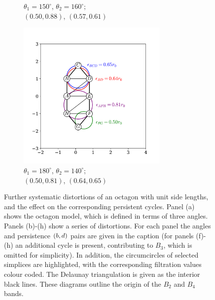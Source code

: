 \begin{figure}[tbp]
\begin{subfigure}[b]{0.32\textwidth}
         \caption{$\theta_1=150^\circ$, $\theta_2=160^\circ$; \\$\left(0.50,0.88\right)$, $\left(0.57,0.61\right)$}
         \label{fig:b4g}
     \end{subfigure}
      \hfill
     \begin{subfigure}[b]{0.32\textwidth}
         \centering
         \includegraphics[width=0.8\textwidth]{./figures/ph/sl_oct_b2_c.pdf}
         \caption{$\theta_1=180^\circ$, $\theta_2=140^\circ$; \\$\left(0.50,0.81\right)$, $\left(0.64,0.65\right)$}
         \label{fig:b4h}
     \end{subfigure}

	\caption{Further systematic distortions of an octagon with unit side lengths, and the effect on the corresponding persistent cycles. Panel (a) shows the octagon model, which is defined in terms of three angles. Panels (b)\--(h) show a series of distortions. For each panel the angles and persistence $\left(b,d\right)$ pairs are given in the caption (for panels (f)\--(h) an additional cycle is present, contributing to $B_3$, which is omitted for simplicity). In addition, the circumcircles of selected simplices are highlighted, with the corresponding filtration values colour coded. The Delaunay triangulation is given as the interior black lines. These diagrams outline the origin of the $B_2$ and $B_4$ bands.}
	\label{fig:b4}
\end{figure}

